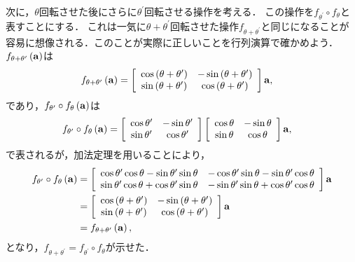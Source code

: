次に，$\theta$回転させた後にさらに$\theta^{\prime}$回転させる操作を考える．
この操作を$f_{\theta^{\prime}}\circ f_{\theta}$と表すことにする．
これは一気に$\theta+\theta^{\prime}$回転させた操作$f_{\theta+\theta^{\prime}}$と同じになることが容易に想像される．このことが実際に正しいことを行列演算で確かめよう．
$f_{\theta+\theta^{\prime}}\left({\bf a}\right)$は
\begin{align}
f_{\theta+\theta^{\prime}}\left({\bf a}\right) & =\left[\begin{array}{cc}
\cos\left(\theta+\theta^{\prime}\right) & -\sin\left(\theta+\theta^{\prime}\right)\\
\sin\left(\theta+\theta^{\prime}\right) & \cos\left(\theta+\theta^{\prime}\right)
\end{array}\right]{\bf a},
\end{align}
%
であり，$f_{\theta^{\prime}}\circ f_{\theta}\left({\bf a}\right)$は
%
\begin{align}
f_{\theta^{\prime}}\circ f_{\theta}\left({\bf a}\right) & =\left[\begin{array}{cc}
\cos\theta^{\prime} & -\sin\theta^{\prime}\\
\sin\theta^{\prime} & \cos\theta^{\prime}
\end{array}\right]\left[\begin{array}{cc}
\cos\theta & -\sin\theta\\
\sin\theta & \cos\theta
\end{array}\right]{\bf a}, 
\end{align}
で表されるが，加法定理を用いることにより，
\begin{align}
f_{\theta^{\prime}}\circ f_{\theta}\left({\bf a}\right) & =\left[\begin{array}{cc}
\cos\theta^{\prime}\cos\theta-\sin\theta^{\prime}\sin\theta & -\cos\theta^{\prime}\sin\theta-\sin\theta^{\prime}\cos\theta\\
\sin\theta^{\prime}\cos\theta+\cos\theta^{\prime}\sin\theta & -\sin\theta^{\prime}\sin\theta+\cos\theta^{\prime}\cos\theta
\end{array}\right]{\bf a}\notag\\
 & =\left[\begin{array}{cc}
\cos\left(\theta+\theta^{\prime}\right) & -\sin\left(\theta+\theta^{\prime}\right)\\
\sin\left(\theta+\theta^{\prime}\right) & \cos\left(\theta+\theta^{\prime}\right)
\end{array}\right]{\bf a}\notag\\
 & =f_{\theta+\theta^{\prime}}\left({\bf a}\right), 
\end{align}
%
となり，$f_{\theta+\theta^{\prime}} = f_{\theta^{\prime}}\circ f_{\theta}$が示せた．
%
